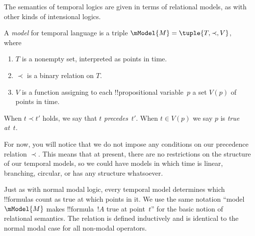 \documentclass[../../../include/open-logic-section]{subfiles}
\begin{document}
The semantics of temporal logics are given in terms of relational models, as with other kinds of intensional logics. 

\begin{defn}
  A \emph{model} for temporal language is a triple
  $\mModel{M} = \tuple{T, \prec, V}$, where
  \begin{enumerate}
  \item $T$ is a nonempty set, interpreted as points in time.
  \item $\prec$ is a binary relation on $T$.
  \item $V$ is a function assigning to each !!{propositional
    variable}~$p$ a set $V(p)$ of points in time.
  \end{enumerate}
  When $t \prec t'$ holds, we say that $t$ \emph{precedes}~$t'$. 
  When $t \in V(p)$ we say $p$ is \emph{true at}~$t$.
\end{defn}

For now, you will notice that we do not impose any conditions on our precedence relation $\prec$. This means that at present, there are no restrictions on the structure of our temporal models, so we could have models in which time is linear, branching, circular, or has any structure whatsoever. 

Just as with normal modal logic, every temporal model determines which
!!{formula}s count as true at which points in it. We use the same
notation ``model $\mModel{M}$ makes !!{formula}~$!A$ true at
point~$t$'' for the basic notion of relational semantics. The relation
is defined inductively and is identical to the normal modal case for
all non-modal operators.
\end{document}
